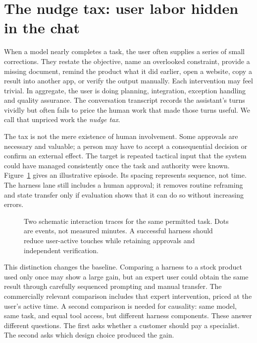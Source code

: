 \section{The nudge tax: user labor hidden in the chat}

When a model nearly completes a task, the user often supplies a series of small corrections. They restate the objective, name an overlooked constraint, provide a missing document, remind the product what it did earlier, open a website, copy a result into another app, or verify the output manually. Each intervention may feel trivial. In aggregate, the user is doing planning, integration, exception handling and quality assurance. The conversation transcript records the assistant's turns vividly but often fails to price the human work that made those turns useful. We call that unpriced work the \emph{nudge tax}.

The tax is not the mere existence of human involvement. Some approvals are necessary and valuable; a person may have to accept a consequential decision or confirm an external effect. The target is repeated tactical input that the system could have managed consistently once the task and authority were known. Figure~\ref{fig:nudge} gives an illustrative episode. Its spacing represents sequence, not time. The harness lane still includes a human approval; it removes routine reframing and state transfer only if evaluation shows that it can do so without increasing errors.

\begin{figure}[tbp]
\centering
\caption{Two schematic interaction traces for the same permitted task. Dots are events, not measured minutes. A successful harness should reduce user-active touches while retaining approvals and independent verification.}
\label{fig:nudge}
\end{figure}

This distinction changes the baseline. Comparing a harness to a stock product used only once may show a large gain, but an expert user could obtain the same result through carefully sequenced prompting and manual transfer. The commercially relevant comparison includes that expert intervention, priced at the user's active time. A second comparison is needed for causality: same model, same task, and equal tool access, but different harness components. These answer different questions. The first asks whether a customer should pay a specialist. The second asks which design choice produced the gain.

